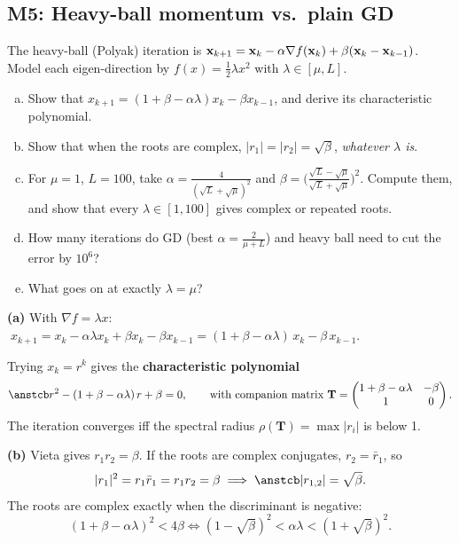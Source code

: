 \subsection{M5: Heavy-ball momentum vs.\ plain GD}

\begin{frame}{}
  \begin{probbox}
    The heavy-ball (Polyak) iteration is
    $\mathbf{x}_{k+1} = \mathbf{x}_k - \alpha\nabla f(\mathbf{x}_k) + \beta(\mathbf{x}_k - \mathbf{x}_{k-1})$.
    Model each eigen-direction by $f(x) = \tfrac12\lambda x^2$ with $\lambda\in[\mu,L]$.
    \begin{enumerate}[(a)]
      \item Show that $x_{k+1} = (1+\beta-\alpha\lambda)x_k - \beta x_{k-1}$, and derive its characteristic polynomial.
      \item Show that when the roots are complex, $|r_1| = |r_2| = \sqrt\beta$, \emph{whatever $\lambda$ is}.
      \item For $\mu = 1$, $L = 100$, take
            $\alpha = \frac{4}{(\sqrt L+\sqrt\mu)^2}$ and $\beta = \bigl(\frac{\sqrt L-\sqrt\mu}{\sqrt L+\sqrt\mu}\bigr)^2$.
            Compute them, and show that every $\lambda\in[1,100]$ gives complex or repeated roots.
      \item How many iterations do GD (best $\alpha = \frac{2}{\mu+L}$) and heavy ball need to cut the error by $10^{6}$?
      \item What goes on at exactly $\lambda = \mu$?
    \end{enumerate}
  \end{probbox}
\end{frame}

\begin{frame}{}
  \textbf{(a)} With $\nabla f = \lambda x$:
  $\;x_{k+1} = x_k - \alpha\lambda x_k + \beta x_k - \beta x_{k-1} = (1+\beta-\alpha\lambda)\,x_k - \beta\,x_{k-1}.$

  Trying $x_k = r^k$ gives the \textbf{characteristic polynomial}
  \[
    \ans{r^2 - (1+\beta-\alpha\lambda)\,r + \beta = 0},
    \qquad\text{with companion matrix } \mathbf T = \begin{pmatrix}1+\beta-\alpha\lambda & -\beta\\ 1 & 0\end{pmatrix}.
  \]
  The iteration converges iff the spectral radius $\rho(\mathbf T) = \max|r_i|$ is below 1.

  \vspace{4pt}
  \textbf{(b)} Vieta gives $r_1 r_2 = \beta$. If the roots are complex conjugates, $r_2 = \bar r_1$, so
  \[
    |r_1|^2 = r_1\bar r_1 = r_1 r_2 = \beta \;\Longrightarrow\; \ans{|r_{1,2}| = \sqrt\beta}.
  \]
  The roots are complex exactly when the discriminant is negative:
  \[
    (1+\beta-\alpha\lambda)^2 < 4\beta
    \iff (1-\sqrt\beta)^2 < \alpha\lambda < (1+\sqrt\beta)^2 .
  \]
\end{frame}

